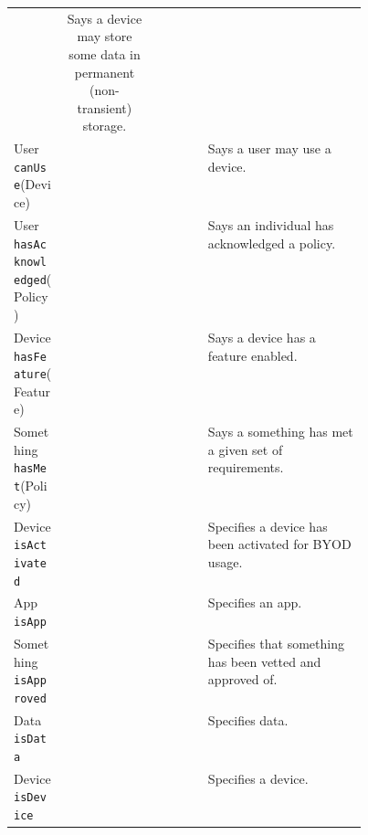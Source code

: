 \documentclass{llncs}
\newcommand{\cmark}{\ding{51}}%
\begin{document}
\begin{table}
\begin{tabular}{l c c c c c p{0.45\linewidth} }
    & Says a device may store some data in permanent (non-transient) storage.              \\
    User \texttt{canUse}(Device)                &                        &                         &                     & \cmark            & \cmark
    & Says a user may use a device.                                                        \\
    User \texttt{hasAcknowledged}(Policy)       & \cmark                 & \cmark                  & \cmark              & \cmark            & \cmark
    & Says an individual has acknowledged a policy.                                        \\
    Device \texttt{hasFeature}(Feature)         &                        & \cmark                  &                     & \cmark            &
    & Says a device has a feature enabled.                                                 \\
    Something \texttt{hasMet}(Policy)           &                        & \cmark                  &                     & \cmark            & \cmark
    & Says a something has met a given set of requirements.                                \\
    Device \texttt{isActivated}                 &                        &                         & \cmark              & \cmark            & \cmark
    & Specifies a device has been activated for BYOD usage.                                \\
    App \texttt{isApp}                          & \cmark                 &                         & \cmark              & \cmark            & \cmark
    & Specifies an app.                                                                    \\
    Something \texttt{isApproved}               &                        &                         & \cmark              &                   & \cmark
    & Specifies that something has been vetted and approved of.                            \\
    Data \texttt{isData}                        & \cmark                 &                         &                     &                   & \cmark
    & Specifies data.                                                                      \\
    Device \texttt{isDevice}                    & \cmark                 & \cmark                  & \cmark              & \cmark            & \cmark
    & Specifies a device.                                                                  \\

\end{tabular}
\end{table}
\end{document}
